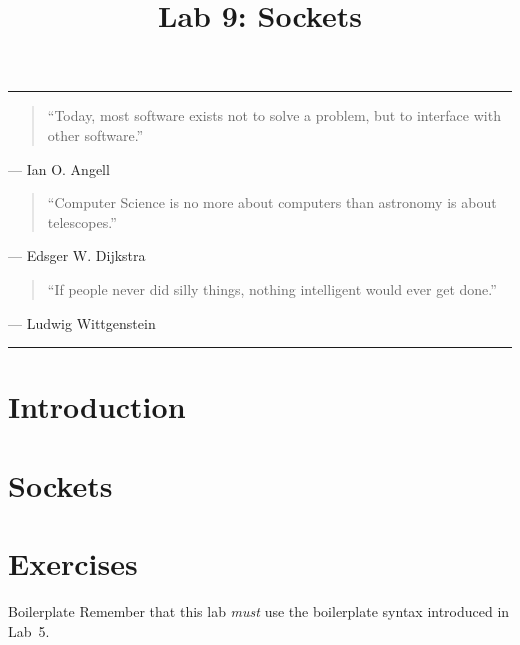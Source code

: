 \documentclass[11pt]{cselabheader}
\title{Lab 9: Sockets}
\begin{document}
\maketitle

\hrule
\begin{quotation}
``Today, most software exists not to solve a problem, but to interface with other
software.''
\end{quotation}
\begin{flushright}
--- Ian O. Angell
\end{flushright}

\begin{quotation}
``Computer Science is no more about computers than astronomy is about
telescopes.''
\end{quotation}
\begin{flushright}
--- Edsger W. Dijkstra
\end{flushright}

\begin{quotation}
``If people never did silly things, nothing intelligent would ever get done.''
\end{quotation}
\begin{flushright}
--- Ludwig Wittgenstein
\end{flushright}

\hrule

\section{Introduction}

\pagebreak
\section{Sockets}
\label{sec:sock}

\pagebreak

\section{Exercises}
\label{sec:ex}

\begin{warningbox}{Boilerplate}
  Remember that this lab \emph{must} use the
  boilerplate syntax introduced in Lab~5.
\end{warningbox}
\end{document}
